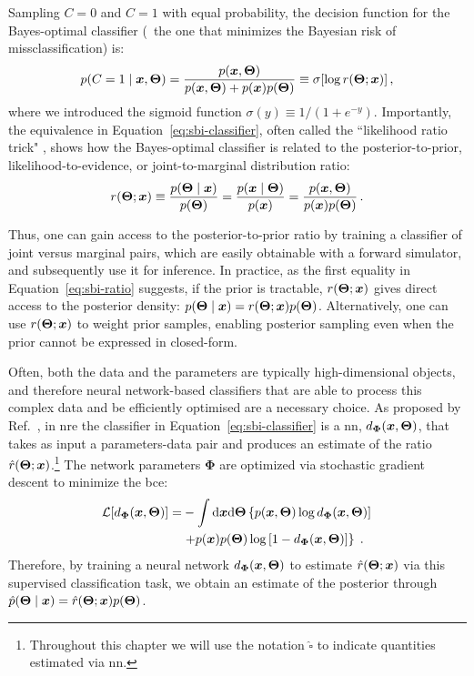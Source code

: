 Sampling $C=0$ and $C=1$ with equal probability, the decision function for the Bayes-optimal classifier  \cite{Devroye:1996aa} (\ie~the one that minimizes the Bayesian risk of missclassification) is:
\begin{equation} \label{eq:sbi-classifier}
    p(C = 1 \mid \bm{x}, \bm{\Theta}) = \frac{p(\bm{x}, \bm{\Theta})}{p(\bm{x}, \bm{\Theta}) + p(\bm{x}) p(\bm{\Theta})} \equiv \sigma[ \log r(\bm{\Theta}; \bm{x})] \, ,
\end{equation}
where we introduced the sigmoid function $\sigma(y) \equiv 1 / (1 + e^{-y})$. Importantly, the equivalence in Equation~\eqref{eq:sbi-classifier}, often called the ``likelihood ratio trick" \cite[\eg][]{cranmer2015approximating, Brehmer:2019jyt}, shows how the Bayes-optimal classifier is related to the  posterior-to-prior, likelihood-to-evidence, or joint-to-marginal distribution ratio:
\begin{equation} \label{eq:sbi-ratio}
    r(\bm{\Theta};\bm{x}) \equiv \frac{p(\bm{\Theta} \mid \bm{x})}{p(\bm{\Theta})} = \frac{p(\bm{x} \mid \bm{\Theta})}{p(\bm{x})} =  \frac{p(\bm{x}, \bm{\Theta})}{p(\bm{x}) p(\bm{\Theta})} \, .
\end{equation}

Thus, one can gain access to the posterior-to-prior ratio by training a classifier of joint versus marginal pairs, which are easily obtainable with a forward simulator, and subsequently use it for inference. In practice, as the first equality in Equation~\eqref{eq:sbi-ratio} suggests, if the prior is tractable, $r(\bm{\Theta};\bm{x})$ gives direct access to the posterior density:  $p(\bm{\Theta} \mid \bm{x})=r(\bm{\Theta};\bm{x})p(\bm{\Theta})$.  Alternatively, one can use $r(\bm{\Theta};\bm{x})$ to weight prior samples, enabling posterior sampling even when the prior cannot be expressed in closed-form.

Often, both the data and the parameters are typically high-dimensional objects, and therefore neural network-based classifiers that are able to process this complex data and be efficiently optimised are a necessary choice.
As proposed by Ref.~\cite{Hermans:2019ioj}, in \gls*{nre} the classifier in Equation~\eqref{eq:sbi-classifier} is a \gls*{nn},  $d_{\bm{\Phi}}(\bm{x}, \bm{\Theta})$, that takes as input a parameters-data pair and produces an estimate of the ratio $\hat{r}(\bm{\Theta};\bm{x})$.\footnote{Throughout this chapter we will use the notation $\hat{\square}$ to indicate quantities estimated via \gls*{nn}.} 
The network parameters ${\bm{\Phi}}$ are optimized via stochastic gradient descent to minimize the \gls*{bce}:
\begin{equation}\label{eq:sbi-bce}
\begin{split}
    \mathcal{L}[d_{\bm{\Phi}}(\bm{x}, \bm{\Theta})] = &-\int \dd \bm{x}  \dd\bm{\Theta} \left\{ p(\bm{x}, \bm{\Theta}) \log d_{\bm{\Phi}}(\bm{x}, \bm{\Theta}) ] \right. \\
    & \left. + p(\bm{x}) p(\bm{\Theta}) \log\left[ 1 - d_{\bm{\Phi}}(\bm{x}, \bm{\Theta}) \right] \right\}\; .
\end{split}
\end{equation}
Therefore, by training a neural network $d_{\bm{\Phi}}(\bm{x}, \bm{\Theta})$ to estimate $\hat{r}(\bm{\Theta}; \bm{x})$ via this supervised classification task, we obtain an estimate of the posterior through $\hat{p}(\bm{\Theta} \mid \bm{x}) = \hat{r}(\bm{\Theta}; \bm{x}) p(\bm{\Theta})$. 

